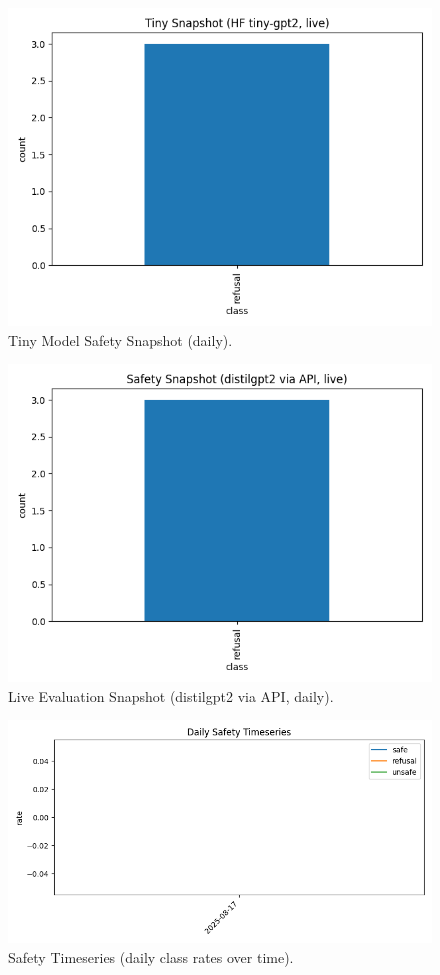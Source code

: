 \documentclass[11pt]{article}
\begin{document}
\begin{figure}[h]
\centering
\includegraphics[width=0.9\linewidth]{results/tiny_snapshot_summary.png}
\caption{Tiny Model Safety Snapshot (daily).}
\end{figure}

\begin{figure}[h]
\centering
\includegraphics[width=0.9\linewidth]{results/tiny_live_summary.png}
\caption{Live Evaluation Snapshot (distilgpt2 via API, daily).}
\end{figure}

\begin{figure}[h]
\centering
\includegraphics[width=0.9\linewidth]{results/safety_timeseries.png}
\caption{Safety Timeseries (daily class rates over time).}
\end{figure}
\end{document}
